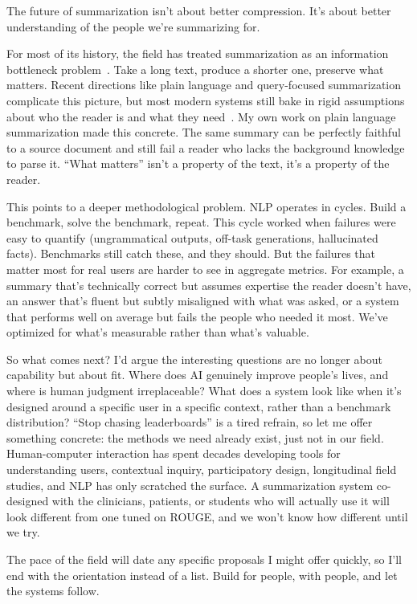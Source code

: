 The future of summarization isn't about better compression. It's about better understanding of the people we're summarizing for.

For most of its history, the field has treated summarization as an information bottleneck problem~\cite{knight2002summarization, clarke2008global}. Take a long text, produce a shorter one, preserve what matters. Recent directions like plain language and query-focused summarization complicate this picture, but most modern systems still bake in rigid assumptions about who the reader is and what they need~\cite{August2024KnowYA,Zhang2023BenchmarkingLL}. My own work on plain language summarization made this concrete. The same summary can be perfectly faithful to a source document and still fail a reader who lacks the background knowledge to parse it. ``What matters'' isn't a property of the text, it's a property of the reader.

This points to a deeper methodological problem. NLP operates in cycles. Build a benchmark, solve the benchmark, repeat. This cycle worked when failures were easy to quantify (ungrammatical outputs, off-task generations, hallucinated facts). Benchmarks still catch these, and they should. But the failures that matter most for real users are harder to see in aggregate metrics. For example, a summary that's technically correct but assumes expertise the reader doesn't have, an answer that's fluent but subtly misaligned with what was asked, or a system that performs well on average but fails the people who needed it most. We've optimized for what's measurable rather than what's valuable.

So what comes next? I'd argue the interesting questions are no longer about capability but about fit. Where does AI genuinely improve people's lives, and where is human judgment irreplaceable? What does a system look like when it's designed around a specific user in a specific context, rather than a benchmark distribution? ``Stop chasing leaderboards'' is a tired refrain, so let me offer something concrete: the methods we need already exist, just not in our field. Human-computer interaction has spent decades developing tools for understanding users, contextual inquiry, participatory design, longitudinal field studies, and NLP has only scratched the surface. A summarization system co-designed with the clinicians, patients, or students who will actually use it will look different from one tuned on ROUGE, and we won't know how different until we try.

The pace of the field will date any specific proposals I might offer quickly, so I'll end with the orientation instead of a list. Build for people, with people, and let the systems follow.